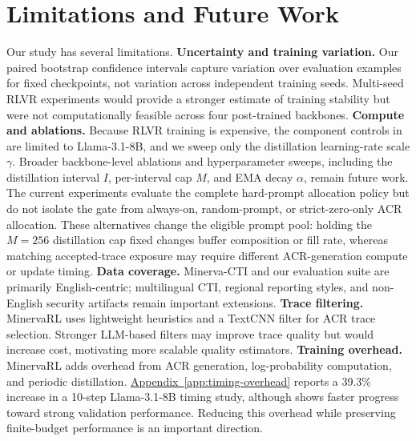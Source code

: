 \section{Limitations and Future Work}
\label{sec:limitations}

Our study has several limitations. \textbf{Uncertainty and training variation.} Our paired bootstrap confidence intervals capture variation over evaluation examples for fixed checkpoints, not variation across independent training seeds. Multi-seed RLVR experiments would provide a stronger estimate of training stability but were not computationally feasible across four post-trained backbones. \textbf{Compute and ablations.} Because RLVR training is expensive, the component controls in  are limited to Llama-3.1-8B, and we sweep only the distillation learning-rate scale $\gamma$. Broader backbone-level ablations and hyperparameter sweeps, including the distillation interval $I$, per-interval cap $M$, and EMA decay $\alpha$, remain future work. The current experiments evaluate the complete hard-prompt allocation policy but do not isolate the gate from always-on, random-prompt, or strict-zero-only ACR allocation. These alternatives change the eligible prompt pool: holding the $M=256$ distillation cap fixed changes buffer composition or fill rate, whereas matching accepted-trace exposure may require different ACR-generation compute or update timing. \textbf{Data coverage.} Minerva-CTI and our evaluation suite are primarily English-centric; multilingual CTI, regional reporting styles, and non-English security artifacts remain important extensions. \textbf{Trace filtering.} MinervaRL uses lightweight heuristics and a TextCNN filter for ACR trace selection. Stronger LLM-based filters may improve trace quality but would increase cost, motivating more scalable quality estimators. \textbf{Training overhead.} MinervaRL adds overhead from ACR generation, log-probability computation, and periodic distillation. \hyperref[app:timing-overhead]{Appendix~\ref*{app:timing-overhead}} reports a 39.3\% increase in a 10-step Llama-3.1-8B timing study, although  shows faster progress toward strong validation performance. Reducing this overhead while preserving finite-budget performance is an important direction.
